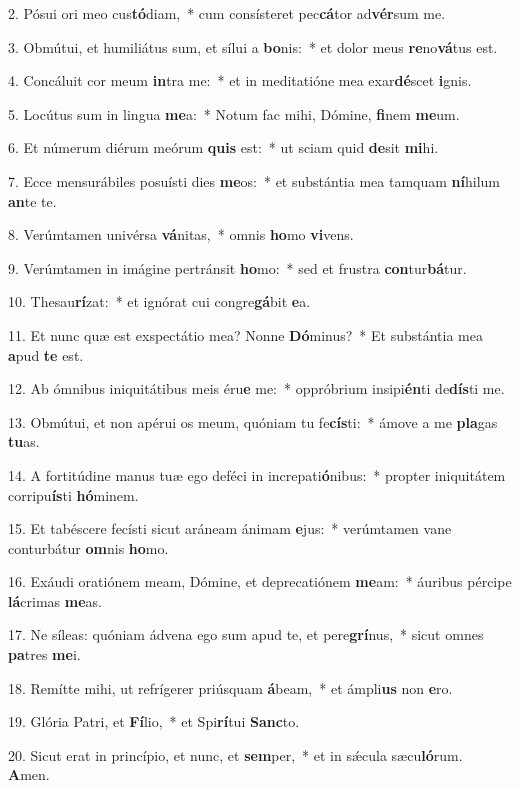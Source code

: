 2. Pósui ori meo cus\textbf{tó}diam,~*  cum consísteret pec\textbf{cá}tor ad\textbf{vér}sum me.\

3. Obmútui, et humiliátus sum, et sílui a \textbf{bo}nis:~*  et dolor meus \textbf{re}no\textbf{vá}tus est.\

4. Concáluit cor meum \textbf{in}tra me:~*  et in meditatióne mea exar\textbf{dé}scet \textbf{i}gnis.\

5. Locútus sum in lingua \textbf{me}a:~*  Notum fac mihi, Dómine, \textbf{fi}nem \textbf{me}um.\

6. Et númerum diérum meórum \textbf{quis} est:~*  ut sciam quid \textbf{de}sit \textbf{mi}hi.\

7. Ecce mensurábiles posuísti dies \textbf{me}os:~*  et substántia mea tamquam \textbf{ní}hilum \textbf{an}te te.\

8. Verúmtamen univérsa \textbf{vá}nitas,~*  omnis \textbf{ho}mo \textbf{vi}vens.\

9. Verúmtamen in imágine pertránsit \textbf{ho}mo:~*  sed et frustra \textbf{con}tur\textbf{bá}tur.\

10. Thesau\textbf{rí}zat:~*  et ignórat cui congre\textbf{gá}bit \textbf{e}a.\

11. Et nunc quæ est exspectátio mea? Nonne \textbf{Dó}minus?~*  Et substántia mea \textbf{a}pud \textbf{te} est.\

12. Ab ómnibus iniquitátibus meis éru\textbf{e} me:~*  oppróbrium insipi\textbf{én}ti de\textbf{dís}ti me.\

13. Obmútui, et non apérui os meum, quóniam tu fe\textbf{cís}ti:~*  ámove a me \textbf{pla}gas \textbf{tu}as.\

14. A fortitúdine manus tuæ ego deféci in increpati\textbf{ó}nibus:~*  propter iniquitátem corripu\textbf{ís}ti \textbf{hó}minem.\

15. Et tabéscere fecísti sicut aráneam ánimam \textbf{e}jus:~*  verúmtamen vane conturbátur \textbf{om}nis \textbf{ho}mo.\

16. Exáudi oratiónem meam, Dómine, et deprecatiónem \textbf{me}am:~*  áuribus pércipe \textbf{lá}crimas \textbf{me}as.\

17. Ne síleas: quóniam ádvena ego sum apud te, et pere\textbf{grí}nus,~*  sicut omnes \textbf{pa}tres \textbf{me}i.\

18. Remítte mihi, ut refrígerer priúsquam \textbf{á}beam,~*  et ámpli\textbf{us} non \textbf{e}ro.\

19. Glória Patri, et \textbf{Fí}lio,~*  et Spi\textbf{rí}tui \textbf{Sanc}to.\

20. Sicut erat in princípio, et nunc, et \textbf{sem}per,~*  et in sǽcula sæcu\textbf{ló}rum. \textbf{A}men.\

